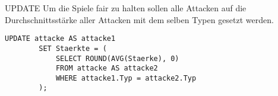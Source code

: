 \begin{example}{UPDATE}
    Um die Spiele fair zu halten sollen alle Attacken auf die Durchschnittsstärke aller Attacken mit dem selben Typen gesetzt werden.

    \exampleseparator

    \begin{lstlisting}[language=mysql]
        UPDATE attacke AS attacke1
        SET Staerkte = (
            SELECT ROUND(AVG(Staerke), 0)
            FROM attacke AS attacke2
            WHERE attacke1.Typ = attacke2.Typ 
        );
    \end{lstlisting}
\end{example}